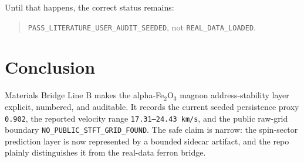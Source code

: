 \documentclass[11pt]{article}
\begin{document}
Until that happens, the correct status remains:

\begin{quote}
\texttt{PASS\_LITERATURE\_USER\_AUDIT\_SEEDED}, not \texttt{REAL\_DATA\_LOADED}.
\end{quote}

\section{Conclusion}

Materials Bridge Line B makes the alpha-Fe$_2$O$_3$ magnon address-stability
layer explicit, numbered, and auditable. It records the current seeded
persistence proxy \texttt{0.902}, the reported velocity range
\texttt{17.31--24.43 km/s}, and the public raw-grid boundary
\texttt{NO\_PUBLIC\_STFT\_GRID\_FOUND}. The safe claim is narrow: the spin-sector
prediction layer is now represented by a bounded sidecar artifact, and the repo
plainly distinguishes it from the real-data ferron bridge.
\end{document}
